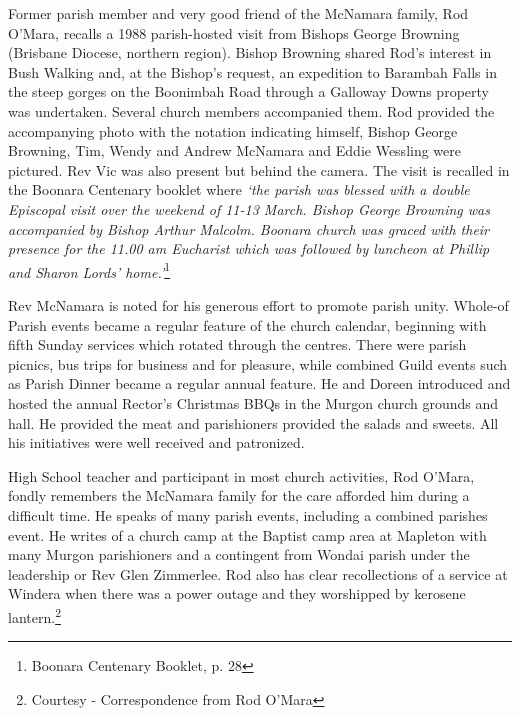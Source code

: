 Former parish member and very good friend of the McNamara family, Rod O'Mara, recalls a 1988 parish-hosted visit from Bishops George Browning (Brisbane Diocese, northern region). Bishop Browning shared Rod's interest in Bush Walking and, at the Bishop's request, an expedition to Barambah Falls in the steep gorges on the Boonimbah Road through a Galloway Downs property was undertaken. Several church members accompanied them. Rod provided the accompanying photo with the notation indicating himself, Bishop George Browning, Tim, Wendy and Andrew McNamara and Eddie Wessling were pictured. Rev Vic was also present but behind the camera. The visit is recalled in the Boonara Centenary booklet where \emph{`the parish was blessed with a double Episcopal visit over the weekend of 11-13 March. Bishop George Browning was accompanied by Bishop Arthur Malcolm. Boonara church was graced with their presence for the 11.00 am Eucharist which was followed by luncheon at Phillip and Sharon Lords' home.'}\footnote{Boonara Centenary Booklet, p. 28}


Rev McNamara is noted for his generous effort to promote parish unity. Whole-of Parish events became a regular feature of the church calendar, beginning with fifth Sunday services which rotated through the centres. There were parish picnics, bus trips for business and for pleasure, while combined Guild events such as Parish Dinner became a regular annual feature. He and Doreen introduced and hosted the annual Rector's Christmas BBQs in the Murgon church grounds and hall. He provided the meat and parishioners provided the salads and sweets. All his initiatives were well received and patronized.



High School teacher and participant in most church activities, Rod O'Mara, fondly remembers the McNamara family for the care afforded him during a difficult time. He speaks of many parish events, including a combined parishes event. He writes of a church camp at the Baptist camp area at Mapleton with many Murgon parishioners and a contingent from Wondai parish under the leadership or Rev Glen Zimmerlee. Rod also has clear recollections of a service at Windera when there was a power outage and they worshipped by kerosene lantern.\footnote{Courtesy - Correspondence from Rod O'Mara}








